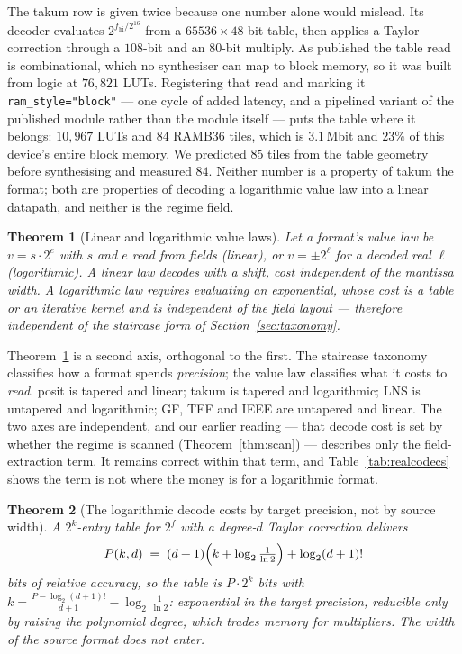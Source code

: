 \documentclass[11pt]{article}
\newtheorem{theorem}{Theorem}
\theoremstyle{definition}
\begin{document}
The takum row is given twice because one number alone would mislead. Its decoder
evaluates $2^{f_{\mathrm{hi}}/2^{16}}$ from a $65536 \times 48$-bit table, then
applies a Taylor correction through a $108$-bit and an $80$-bit multiply. As
published the table read is combinational, which no synthesiser can map to block
memory, so it was built from logic at $76{,}821$ LUTs. Registering that read and
marking it \texttt{ram\_style="block"} --- one cycle of added latency, and a
pipelined variant of the published module rather than the module itself --- puts
the table where it belongs: $10{,}967$ LUTs and $84$ RAMB36 tiles, which is
$3.1$\,Mbit and $23\%$ of this device's entire block memory. We predicted $85$
tiles from the table geometry before synthesising and measured $84$. Neither
number is a property of takum the format; both are properties of decoding a
logarithmic value law into a linear datapath, and neither is the regime field.

\begin{theorem}[Linear and logarithmic value laws]
\label{thm:valuelaw}
Let a format's value law be $v = s \cdot 2^{e}$ with $s$ and $e$ read from fields
(\emph{linear}), or $v = \pm 2^{\ell}$ for a decoded real $\ell$
(\emph{logarithmic}). A linear law decodes with a shift, cost independent of the
mantissa width. A logarithmic law requires evaluating an exponential, whose cost
is a table or an iterative kernel and is independent of the field layout ---
therefore independent of the staircase form of Section~\ref{sec:taxonomy}.
\end{theorem}

Theorem~\ref{thm:valuelaw} is a second axis, orthogonal to the first. The
staircase taxonomy classifies how a format spends \emph{precision}; the value law
classifies what it costs to \emph{read}. posit is tapered and linear; takum is
tapered and logarithmic; LNS is untapered and logarithmic; GF, TEF and IEEE are
untapered and linear. The two axes are independent, and our earlier reading ---
that decode cost is set by whether the regime is scanned
(Theorem~\ref{thm:scan}) --- describes only the field-extraction term. It remains
correct within that term, and Table~\ref{tab:realcodecs} shows the term is not
where the money is for a logarithmic format.


\begin{theorem}[The logarithmic decode costs by target precision, not by source width]
\label{thm:targetprec}
A $2^{k}$-entry table for $2^{f}$ with a degree-$d$ Taylor correction delivers
\[
P(k,d) \;=\; (d+1)\Bigl(k + \log_2\tfrac{1}{\ln 2}\Bigr) + \log_2 (d+1)!
\]
bits of relative accuracy, so the table is $P \cdot 2^{k}$ bits with
$k = \frac{P - \log_2 (d+1)!}{d+1} - \log_2\frac{1}{\ln 2}$: exponential in the
target precision, reducible only by raising the polynomial degree, which trades
memory for multipliers. The width of the source format does not enter.
\end{theorem}
\end{document}
